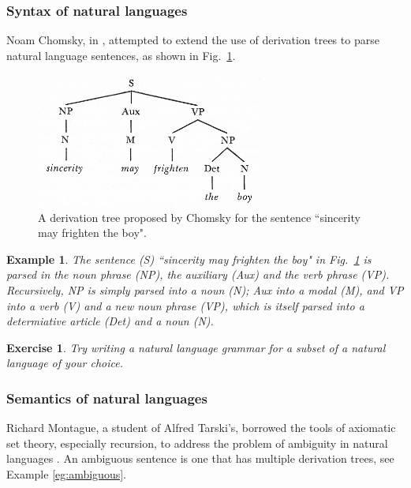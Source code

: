 \documentclass[a4paper]{book}
\theoremstyle{changebreak}                %
\newtheorem{eg}[result]{Example}
\newtheorem{ex}[result]{Exercise}
\begin{document}
\subsubsection{Syntax of natural
  languages}
\label{s:tree:language:syntnat}
Noam Chomsky, in \cite{chomsky}, attempted to
extend the use of derivation trees to parse natural language
sentences, as shown in Fig.~\ref{f:chomsky}.
\begin{figure}[!ht]
\begin{center}
\includegraphics[width=7.5cm]{chomsky}
\end{center}
\caption{A derivation tree proposed by Chomsky \cite[p.~65]{chomsky}
  for the sentence ``sincerity may frighten the boy".}
\label{f:chomsky}
\end{figure}

\begin{eg}
The sentence (S) ``sincerity may frighten the boy" in
Fig.~\ref{f:chomsky} is parsed in the noun phrase (NP), the auxiliary
(Aux) and the verb phrase (VP). Recursively, NP is simply parsed into
a noun (N); Aux into a modal (M), and VP into a verb (V) and a new
noun phrase (VP), which is itself parsed into a determiative article
(Det) and a noun (N).
\end{eg}

\begin{ex}
Try writing a natural language grammar for a subset of a natural
language of your choice.
\end{ex}

\subsubsection{Semantics of natural languages}
Richard Montague, a student of Alfred
Tarski's, borrowed the tools of axiomatic set
theory, especially recursion, to address the problem of ambiguity in
natural languages \cite{montague}. An ambiguous sentence is one that
has multiple derivation trees, see Example \ref{eg:ambiguous}.
\end{document}
